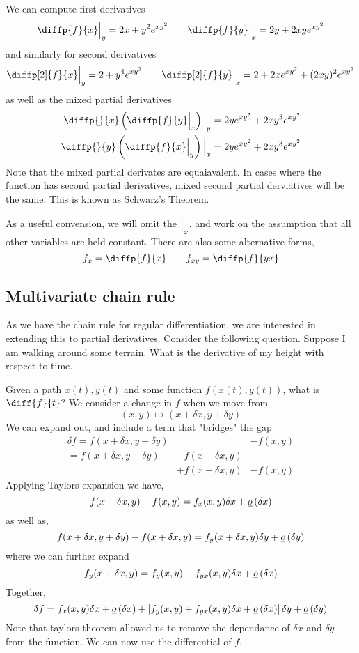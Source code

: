 \documentclass{article}
\begin{document}
\begin{eg}[$f(x) = x^2 + y^2 + e^{xy^2}$]
    We can compute first derivatives
    \[
        \diffp{f}{x} \Big{|}_{y} = 2x + y^2e^{xy^2} \qquad \diffp{f}{y} \Big{|}_{x} = 2y + 2xye^{xy^2}
    \]
    and similarly for second derivatives
    \[
        \diffp[2]{f}{x} \Big{|}_{y} = 2 + y^4e^{xy^2} \qquad \diffp[2]{f}{y} \Big{|}_{x} = 2 + 2xe^{xy^2} + (2xy)^2e^{xy^2}
    \]
    as well as the mixed partial derivatives
    \begin{align*}
        \diffp{}{x}\bkt{\diffp{f}{y} \Big{|}_{x}} \Big{|}_{y} &= 2ye^{xy^2} + 2xy^3e^{xy^2} \\
        \diffp{}{y}\bkt{\diffp{f}{x} \Big{|}_{y}} \Big{|}_{x} &= 2ye^{xy^2} + 2xy^3e^{xy^2} \\
    \end{align*}
    Note that the mixed partial derivates are equaiavalent. In cases where the function has second partial derivatives, mixed second partial derviatives will be the same. This is known as Schwarz's Theorem.
\end{eg}

\begin{notation}
    As a useful convension, we will omit the $\Big{|}_{x}$, and work on the assumption that all other variables are held constant. There are also some alternative forms,
    \[
        f_x = \diffp{f}{x} \qquad f_{xy} = \diffp{f}{{y}{x}}  
    \]
\end{notation}
\subsection{Multivariate chain rule}
As we have the chain rule for regular differentiation, we are interested in extending this to partial derivatives. Consider the following question. Suppose I am walking around some terrain. What is the derivative of my height with respect to time.

Given a path $x(t), y(t)$ and some function $f(x(t), y(t))$, what is $\diff{f}{t}$? We consider a change in $f$ when we move from 
\[
    (x, y) \mapsto (x + \delta x, y + \delta y)    
\]
We can expand out, and include a term that "bridges" the gap
\begin{align*}
    \delta f = f(x + \delta x, y + \delta y) & &- f(x, y) \\
    = f(x + \delta x, y + \delta y) &- f(x + \delta x, y) \\
    &+f(x + \delta x, y) &- f(x, y)
\end{align*}
Applying Taylors expansion we have,
\[
    f(x + \delta x, y) - f(x, y) = f_x(x, y)\delta x + \underline{o}\left( \delta x \right)
\]
as well as,
\[
    f(x + \delta x, y + \delta y) - f(x + \delta x, y) = f_y(x + \delta x, y)\delta y + \underline{o}\left( \delta y \right)
\]
where we can further expand
\[
    f_y(x + \delta x, y) = f_y(x, y) + f_{yx}(x, y)\delta x + \underline{o}\left( \delta x \right)
\]
Together,
\[
    \delta f = f_x(x, y)\delta x + \underline{o}\left( \delta x \right) + \left[ f_y(x, y) + f_{yx}(x, y)\delta x + \underline{o}\left( \delta x \right) \right]\delta y + \underline{o}\left( \delta y \right)
\]
Note that taylors theorem allowed us to remove the dependance of $\delta x$ and $\delta y$ from the function. We can now use the differential of $f$.
\end{document}
